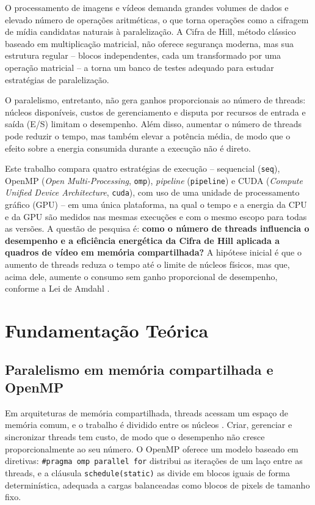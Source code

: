 \documentclass[12pt]{article}
\begin{document}
O processamento de imagens e vídeos demanda grandes volumes de dados e elevado
número de operações aritméticas, o que torna operações como a cifragem de mídia
candidatas naturais à paralelização. A Cifra de Hill, método clássico baseado em
multiplicação matricial, não oferece segurança moderna, mas sua estrutura
regular -- blocos independentes, cada um transformado por uma operação
matricial -- a torna um banco de testes adequado para estudar estratégias de
paralelização.

O paralelismo, entretanto, não gera ganhos proporcionais ao número de threads:
núcleos disponíveis, custos de gerenciamento e disputa por recursos de
entrada e saída (E/S) limitam o desempenho. Além disso, aumentar o número de
threads pode reduzir o tempo, mas também elevar a potência média, de modo que
o efeito sobre a energia consumida durante a execução não é direto.

Este trabalho compara quatro estratégias de execução -- sequencial
(\texttt{seq}), OpenMP (\textit{Open Multi-Processing}, \texttt{omp}),
\textit{pipeline} (\texttt{pipeline}) e CUDA
(\textit{Compute Unified Device Architecture}, \texttt{cuda}), com uso de uma
unidade de processamento gráfico (GPU) -- em uma única plataforma, na qual o
tempo e a energia da CPU e da GPU são medidos nas mesmas execuções e com o
mesmo escopo para todas as versões. A questão de pesquisa é:
\textbf{como o número de threads influencia o desempenho e a eficiência
energética da Cifra de Hill aplicada a quadros de vídeo em memória
compartilhada?} A hipótese inicial é que o aumento de threads reduza o tempo até
o limite de núcleos físicos, mas que, acima dele, aumente o consumo sem ganho
proporcional de desempenho, conforme a Lei de Amdahl \cite{amdahl1967}.


\section{Fundamentação Teórica}

\subsection{Paralelismo em memória compartilhada e OpenMP}

Em arquiteturas de memória compartilhada, threads acessam um espaço de memória
comum, e o trabalho é dividido entre os núcleos \cite{grama2003}. Criar,
gerenciar e sincronizar threads tem custo, de modo que o desempenho não cresce
proporcionalmente ao seu número. O OpenMP oferece um modelo baseado em diretivas:
\texttt{\#pragma omp parallel for} distribui as iterações de um laço entre as
threads, e a cláusula \texttt{schedule(static)} as divide em blocos iguais de
forma determinística, adequada a cargas balanceadas como blocos de pixels de
tamanho fixo.
\end{document}
